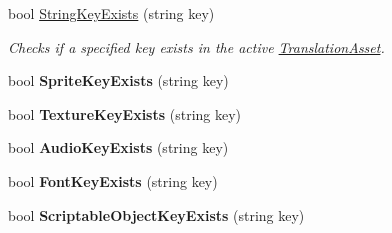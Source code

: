 \begin{DoxyCompactItemize}
\item 
bool \hyperlink{class_translator_a4f6ac2cf37d3f416a77a1a6c75173e16}{String\+Key\+Exists} (string key)
\begin{DoxyCompactList}\small\item\em Checks if a specified key exists in the active \hyperlink{class_translation_asset}{Translation\+Asset}. \end{DoxyCompactList}\item 
bool {\bfseries Sprite\+Key\+Exists} (string key)\hypertarget{class_translator_a2e0bc9c5c53cf92a308afb5e9153ff73}{}\label{class_translator_a2e0bc9c5c53cf92a308afb5e9153ff73}

\item 
bool {\bfseries Texture\+Key\+Exists} (string key)\hypertarget{class_translator_aac32593fc0c17193b4f5aa9d01e69979}{}\label{class_translator_aac32593fc0c17193b4f5aa9d01e69979}

\item 
bool {\bfseries Audio\+Key\+Exists} (string key)\hypertarget{class_translator_a6174bb933a1c78659ec6de23b7f619b7}{}\label{class_translator_a6174bb933a1c78659ec6de23b7f619b7}

\item 
bool {\bfseries Font\+Key\+Exists} (string key)\hypertarget{class_translator_a5c57f65e88bc66abb26b296d92a560ca}{}\label{class_translator_a5c57f65e88bc66abb26b296d92a560ca}

\item 
bool {\bfseries Scriptable\+Object\+Key\+Exists} (string key)\hypertarget{class_translator_a7e8092c1aa97c08ce7a860f2955a5f7e}{}\label{class_translator_a7e8092c1aa97c08ce7a860f2955a5f7e}

\end{DoxyCompactItemize}
